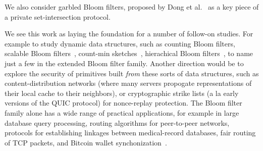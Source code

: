 We also consider garbled Bloom filters, proposed by Dong et al.~\cite{dong2013private} as a key piece of a private set-intersection protocol.

We see this work as laying the foundation for a number of follow-on studies.  For example to study dynamic data structures, such as counting Bloom filters\cite{fan2000summary}, scalable Bloom filters~\cite{almeida2007scalable}, count-min sketches~\cite{cormode2005improved}, hierachical Bloom filters~\cite{zhu2004hierarchical}, to name just a few in the extended Bloom filter family.  Another direction would be to explore the security of primitives built \emph{from} these sorts of data structures, such as content-distribution networks (where many servers propogate representations of their local cache to their neighbors), or cryptographic strike lists (a la early versions of the QUIC protocol) for nonce-replay protection.  The Bloom filter family alone has a wide range of practical applications, for example in large database query
processing, routing algorithms for peer-to-peer networks, protocols
for establishing linkages between medical-record databases, fair
routing of TCP packets, and Bitcoin wallet synchonization~\cite{schnell2011novel,niedermeyer2014cryptanalysis,gervais2014privacy,nojima2009cryptographically,feng2001stochastic,reynolds2003efficient,byers2002informed,broder2004network}.


